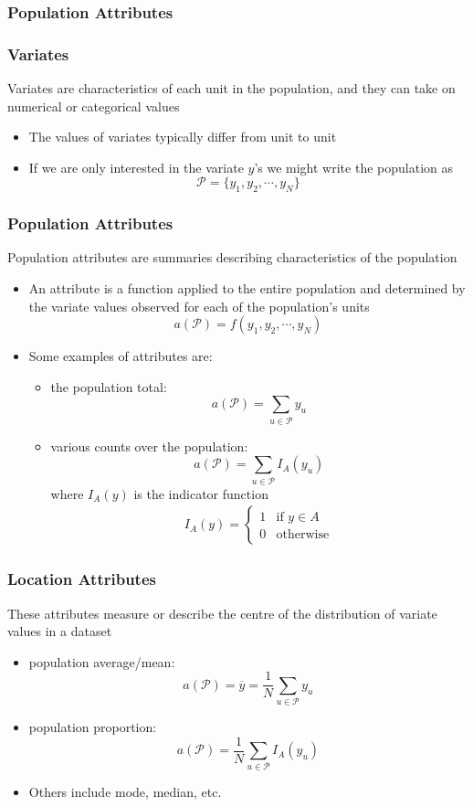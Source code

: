 \documentclass[11pt]{article}
\begin{document}
\subsubsection{Population Attributes}
\subsubsection*{Variates}
Variates are characteristics of each unit in the population, and they can take on numerical or categorical values 
\begin{itemize}
    \item The values of variates typically differ from unit to unit 
    \item If we are only interested in the variate $y$'s we might write the population as \[\mathcal{P}=\{y_1,y_2,\cdots,y_N\}\]
\end{itemize}
\subsubsection*{Population Attributes}
Population attributes are summaries describing characteristics of the population 
\begin{itemize}
    \item An attribute is a function applied to the entire population and determined by the variate values observed for each of the population's units \[a(\mathcal{P})=f(y_1,y_2,\cdots,y_N)\]
    \item Some examples of attributes are:
    \begin{itemize}
        \item the population total: \[a(\mathcal{P})=\sum_{u\in\mathcal{P}}y_u\]   
        \item various counts over the population: \[a(\mathcal{P})=\sum_{u\in\mathcal{P}}I_A(y_u)\] where $I_A(y)$ is the indicator function 
        \begin{align*}
            I_A(y) = \begin{cases}
                1 & \text{if } y\in A \\
                0 & \text{otherwise}
            \end{cases}
        \end{align*}
    \end{itemize}
\end{itemize}
\subsubsection*{Location Attributes}
These attributes measure or describe the centre of the distribution of variate values in a dataset
\begin{itemize}
    \item population average/mean: \[a(\mathcal{P})=\overline{y}=\frac{1}{N}\sum_{u\in\mathcal{P}}y_u\]
    \item population proportion: \[a(\mathcal{P})=\frac{1}{N}\sum_{u\in\mathcal{P}}I_A(y_u)\]
    \item Others include mode, median, etc.
\end{itemize}
\end{document}
